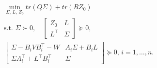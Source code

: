 \documentclass[10pt,a4paper]{amsart}
\newcommand{\trace}{\textit{tr}}
\begin{document}
\begin{equation} \label{eq:Robust LQR problem controllability}
    \begin{aligned}
         &\min_{\Sigma ,\,L,\,Z_0} \trace \left (  Q\Sigma  \right ) + \trace \left ( R Z_0 \right) \\
        &\text{s.t. } \Sigma \succ 0, \quad
        \begin{bmatrix}
            Z_0 & L\\
            L^\top & \Sigma 
        \end{bmatrix}\succeq 0, \\
        &
        \begin{bmatrix}
        \Sigma-B_i V B_i^\top-W & A_i \Sigma + B_i L \\
        \Sigma A_i^\top + L^\top B_i^\top & \Sigma
    \end{bmatrix} \succeq 0, \,i=1,\hdots,n.
    \end{aligned}
\end{equation}
\end{document}
